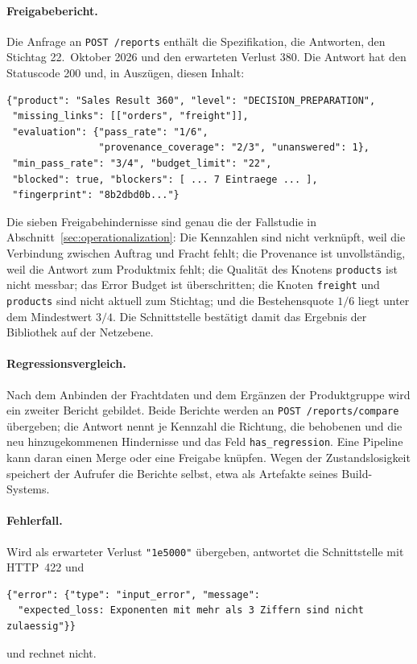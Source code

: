 \documentclass[a4paper,12pt]{article}
\theoremstyle{definition}
\begin{document}
\paragraph{Freigabebericht.}
Die Anfrage an \texttt{POST /reports} enthält die Spezifikation, die Antworten, den Stichtag 22.~Oktober 2026 und den erwarteten Verlust 380. Die Antwort hat den Statuscode 200 und, in Auszügen, diesen Inhalt:
\begin{lstlisting}
{"product": "Sales Result 360", "level": "DECISION_PREPARATION",
 "missing_links": [["orders", "freight"]],
 "evaluation": {"pass_rate": "1/6",
                "provenance_coverage": "2/3", "unanswered": 1},
 "min_pass_rate": "3/4", "budget_limit": "22",
 "blocked": true, "blockers": [ ... 7 Eintraege ... ],
 "fingerprint": "8b2dbd0b..."}
\end{lstlisting}
Die sieben Freigabehindernisse sind genau die der Fallstudie in Abschnitt~\ref{sec:operationalization}: Die Kennzahlen sind nicht verknüpft, weil die Verbindung zwischen Auftrag und Fracht fehlt; die Provenance ist unvollständig, weil die Antwort zum Produktmix fehlt; die Qualität des Knotens \texttt{products} ist nicht messbar; das Error Budget ist überschritten; die Knoten \texttt{freight} und \texttt{products} sind nicht aktuell zum Stichtag; und die Bestehensquote $1/6$ liegt unter dem Mindestwert $3/4$. Die Schnittstelle bestätigt damit das Ergebnis der Bibliothek auf der Netzebene.

\paragraph{Regressionsvergleich.}
Nach dem Anbinden der Frachtdaten und dem Ergänzen der Produktgruppe wird ein zweiter Bericht gebildet. Beide Berichte werden an \texttt{POST /reports/compare} übergeben; die Antwort nennt je Kennzahl die Richtung, die behobenen und die neu hinzugekommenen Hindernisse und das Feld \texttt{has\_regression}. Eine Pipeline kann daran einen Merge oder eine Freigabe knüpfen. Wegen der Zustandslosigkeit speichert der Aufrufer die Berichte selbst, etwa als Artefakte seines Build-Systems.

\paragraph{Fehlerfall.}
Wird als erwarteter Verlust \texttt{"1e5000"} übergeben, antwortet die Schnittstelle mit HTTP~422 und
\begin{lstlisting}
{"error": {"type": "input_error", "message":
  "expected_loss: Exponenten mit mehr als 3 Ziffern sind nicht zulaessig"}}
\end{lstlisting}
und rechnet nicht.
\end{document}
